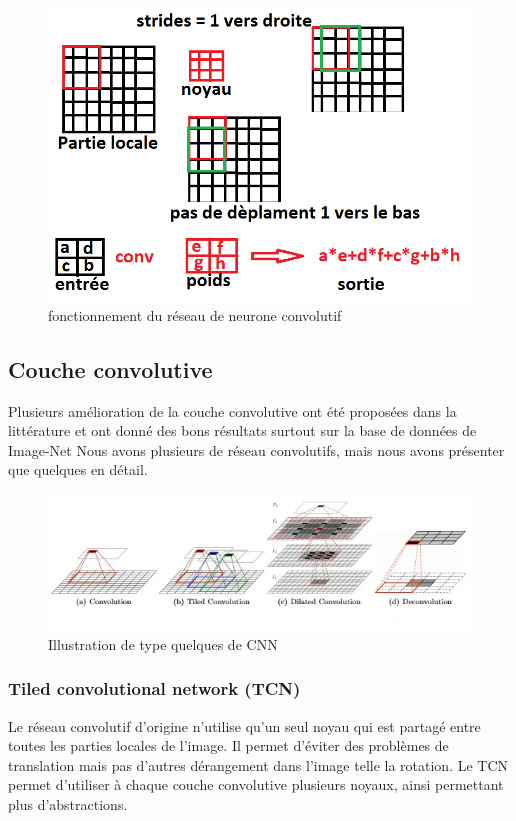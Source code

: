 \begin{figure}[H]
    \centering
    \includegraphics[scale = 0.7]{images/operations_conv.png}
    \caption{fonctionnement du réseau de neurone convolutif}
\end{figure}

\subsection{Couche convolutive}
Plusieurs amélioration de la couche convolutive ont été proposées dans la littérature et ont donné des bons résultats surtout sur la base de données de Image-Net \cite{}%
Nous avons plusieurs de réseau convolutifs, mais nous avons présenter que quelques en détail.
\begin{figure}[H]
    \centering
    \includegraphics[scale = 0.8]{images/all_cnn.png}
    \caption{Illustration de type quelques de CNN}
\end{figure}
\subsubsection{Tiled convolutional network (TCN)}
Le réseau convolutif d'origine n'utilise qu'un seul noyau qui est partagé entre toutes les parties locales de l'image. Il permet d'éviter des problèmes de translation mais pas d'autres dérangement dans l'image telle la rotation. Le TCN permet d'utiliser à chaque couche convolutive plusieurs noyaux, ainsi permettant plus d'abstractions\cite{tcnn1, tcnn2, tcnn3}. 



